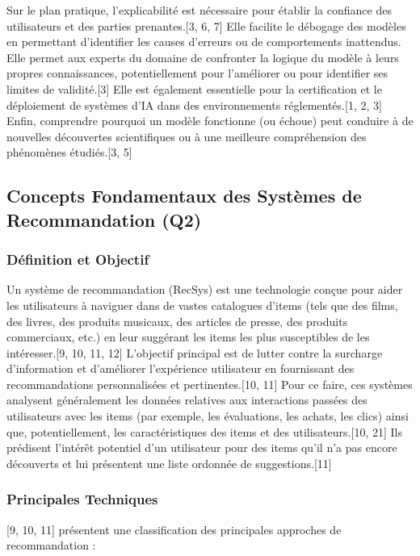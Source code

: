 \documentclass[11pt,a4paper]{article}
\begin{document}
Sur le plan pratique, l'explicabilité est nécessaire pour établir la confiance des utilisateurs et des parties prenantes.[3, 6, 7] Elle facilite le débogage des modèles en permettant d'identifier les causes d'erreurs ou de comportements inattendus. Elle permet aux experts du domaine de confronter la logique du modèle à leurs propres connaissances, potentiellement pour l'améliorer ou pour identifier ses limites de validité.[3] Elle est également essentielle pour la certification et le déploiement de systèmes d'IA dans des environnements réglementés.[1, 2, 3] Enfin, comprendre pourquoi un modèle fonctionne (ou échoue) peut conduire à de nouvelles découvertes scientifiques ou à une meilleure compréhension des phénomènes étudiés.[3, 5]

\subsection{Concepts Fondamentaux des Systèmes de Recommandation (Q2)}

\subsubsection{Définition et Objectif}
Un système de recommandation (RecSys) est une technologie conçue pour aider les utilisateurs à naviguer dans de vastes catalogues d'items (tels que des films, des livres, des produits musicaux, des articles de presse, des produits commerciaux, etc.) en leur suggérant les items les plus susceptibles de les intéresser.[9, 10, 11, 12] L'objectif principal est de lutter contre la surcharge d'information et d'améliorer l'expérience utilisateur en fournissant des recommandations personnalisées et pertinentes.[10, 11] Pour ce faire, ces systèmes analysent généralement les données relatives aux interactions passées des utilisateurs avec les items (par exemple, les évaluations, les achats, les clics) ainsi que, potentiellement, les caractéristiques des items et des utilisateurs.[10, 21] Ils prédisent l'intérêt potentiel d'un utilisateur pour des items qu'il n'a pas encore découverts et lui présentent une liste ordonnée de suggestions.[11]

\subsubsection{Principales Techniques}
\citet{Ko2022} [9, 10, 11] présentent une classification des principales approches de recommandation :
\end{document}
